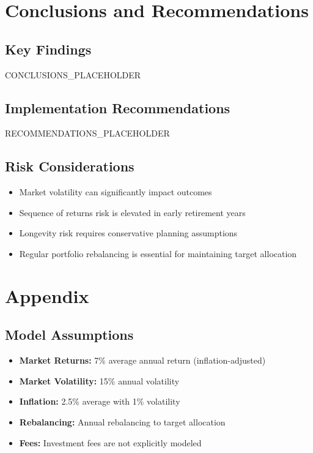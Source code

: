 \documentclass[11pt,a4paper]{article}
\begin{document}
\section{Conclusions and Recommendations}

\subsection{Key Findings}

CONCLUSIONS_PLACEHOLDER

\subsection{Implementation Recommendations}

RECOMMENDATIONS_PLACEHOLDER

\subsection{Risk Considerations}

\begin{itemize}
\item Market volatility can significantly impact outcomes
\item Sequence of returns risk is elevated in early retirement years
\item Longevity risk requires conservative planning assumptions
\item Regular portfolio rebalancing is essential for maintaining target allocation
\end{itemize}

\section{Appendix}

\subsection{Model Assumptions}

\begin{itemize}
\item \textbf{Market Returns:} 7\% average annual return (inflation-adjusted)
\item \textbf{Market Volatility:} 15\% annual volatility
\item \textbf{Inflation:} 2.5\% average with 1\% volatility
\item \textbf{Rebalancing:} Annual rebalancing to target allocation
\item \textbf{Fees:} Investment fees are not explicitly modeled
\end{itemize}
\end{document}
